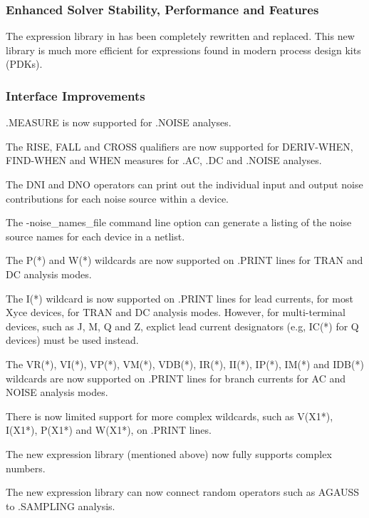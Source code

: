 \documentclass[letterpaper]{scrartcl}
\begin{document}
\subsubsection*{Enhanced Solver Stability, Performance and Features}
\begin{XyceItemize}
\item The expression library in \Xyce{} has been completely rewritten and replaced.  This new library is much more efficient for expressions found in modern process design kits (PDKs).  
\end{XyceItemize}

\subsubsection*{Interface Improvements}
\begin{XyceItemize}
  \item .MEASURE is now supported for .NOISE analyses.
  \item The RISE, FALL and CROSS qualifiers are now supported for
    DERIV-WHEN, FIND-WHEN and WHEN measures for .AC, .DC and .NOISE analyses.
  \item The DNI and DNO operators can print out the individual input and
    output noise contributions for each noise source within a device.
  \item The -noise\_names\_file command line option can generate a
    listing of the noise source names for each device in a netlist.
  \item The P(*) and W(*) wildcards are now supported on .PRINT lines
    for TRAN and DC analysis modes.
  \item The I(*) wildcard is now supported on .PRINT lines for lead
    currents, for most Xyce devices, for TRAN and DC analysis modes.
    However, for multi-terminal devices, such as J, M, Q and Z,
    explict lead current designators (e.g, IC(*) for Q devices) must
    be used instead.
  \item The VR(*), VI(*), VP(*), VM(*), VDB(*), IR(*), II(*), IP(*),
    IM(*) and IDB(*) wildcards are now supported on .PRINT lines
    for branch currents for AC and NOISE analysis modes.
  \item There is now limited support for more complex wildcards,
    such as V(X1*), I(X1*), P(X1*) and W(X1*), on .PRINT lines.
  \item The new expression library (mentioned above) now fully supports complex numbers.
  \item The new expression library can now connect random operators such as AGAUSS to .SAMPLING analysis.
\end{XyceItemize}
\end{document}
